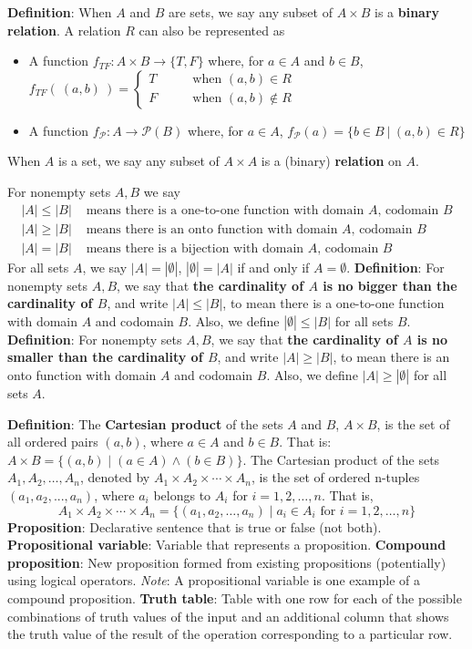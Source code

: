 \documentclass[12pt, oneside]{article}
\begin{document}
{\bf Definition}: When $A$ and $B$ are sets, we say any subset of $A \times B$ is a {\bf binary relation}. 
A relation $R$ can also be represented as
\begin{itemize}
\item A function $f_{TF} : A \times B \to \{T, F\}$
where, for $a \in A$ and $b \in B$, $f_{TF}(~(a,b)~) = 
\begin{cases} 
    T \qquad&\text{when } (a,b) \in R \\
    F \qquad&\text{when } (a,b) \notin R
\end{cases}$
\item A function $f_{\mathcal{P}} : A   \to \mathcal{P}(B)$ where, for $a \in A$, 
$f_{\mathcal{P}}( a ) = \{ b \in B ~|~ (a,b) \in R \}$
\end{itemize}
When $A$ is a set, we say any subset of $A \times A$ is a (binary) {\bf relation} on $A$.

For nonempty sets $A, B$ we say
\begin{align*}
|A| \leq |B| &\text{ means there is a one-to-one function with domain $A$, codomain $B$} \\
|A| \geq |B| &\text{ means there is an onto function with domain $A$, codomain $B$} \\
|A| = |B| &\text{ means there is a bijection with domain $A$, codomain $B$}
\end{align*}
For all sets $A$, we say $|A| = |\emptyset|$, $|\emptyset| = |A|$ if and only if $A = \emptyset$.
{\bf Definition}:  For nonempty sets $A, B$, we say that {\bf the  cardinality of $A$ is  no  bigger than the cardinality of $B$}, 
and write $|A| \leq |B|$, to mean there is a  one-to-one function  with domain $A$  and codomain $B$.
Also, we define $|\emptyset| \leq |B|$ for all sets $B$.
{\bf Definition}:  For nonempty sets $A, B$, we say that {\bf the  cardinality of $A$ is  no  smaller than 
the cardinality of  $B$}, and 
write $|A| \geq |B|$, to mean there is an onto function  with domain $A$  and codomain $B$.
Also, we define $|A| \geq |\emptyset|$ for all sets $A$.

{\bf Definition}: The {\bf Cartesian product} of the sets $A$ and $B$, 
$A \times B$, is the set of all ordered pairs $(a, b)$, where $a \in A$ and $b \in B$. 
That is: $A \times B = \{(a, b) \mid (a \in A) \land (b \in B)\}$.
The Cartesian product of the sets $A_1, A_2, \ldots ,A_n$, denoted by 
$A_1 \times A_2 \times \cdots \times A_n$, is the
set of ordered n-tuples $(a_1, a_2,...,a_n)$, where $a_i$ belongs to 
$A_i$ for $i = 1, 2,\ldots,n$. That is,
\[
    A_1 \times A_2 \times \cdots \times A_n = \{(a_1, a_2,\ldots,a_n) \mid a_i \in A_i \textrm{ for } i = 1, 2,\ldots,n\}
\]
{\bf Proposition}: Declarative sentence that is true or false (not both).
{\bf Propositional variable}: Variable that represents a proposition.
{\bf Compound proposition}: New proposition formed from existing propositions (potentially) using logical operators.
{\it Note}: A propositional variable is one example of a compound proposition.
{\bf Truth table}: Table with one row for each of the possible combinations of truth values of the input and 
    an additional column that shows the truth value of the result of the operation corresponding to a particular row.
    
\end{document}

